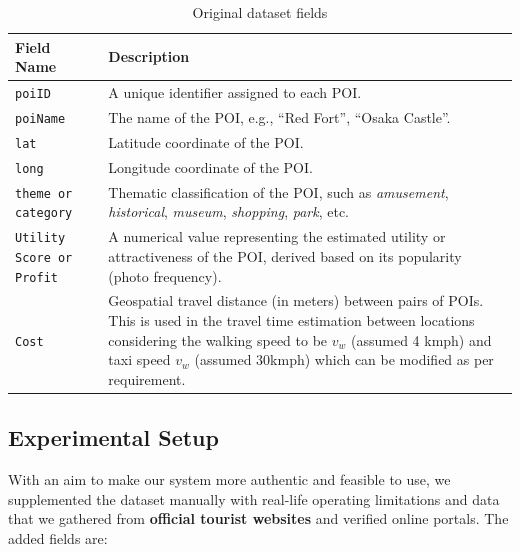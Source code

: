 \begin{table}[H]
\begin{tabularx}{0.5\textwidth}{p{3cm} X}
\hline
\textbf{Field Name} & \textbf{Description} \\
\hline
\texttt{poiID} & A unique identifier assigned to each POI. \\
\hline
\texttt{poiName} & The name of the POI, e.g., ``Red Fort'', ``Osaka Castle''. \\
\hline
\texttt{lat} & Latitude coordinate of the POI. \\
\hline
\texttt{long} & Longitude coordinate of the POI. \\
\hline
\texttt{theme or category} & Thematic classification of the POI, such as \textit{amusement}, \textit{historical}, \textit{museum}, \textit{shopping}, \textit{park}, etc. \\
\hline
\texttt{Utility Score or Profit} & A numerical value representing the estimated utility or attractiveness of the POI, derived based on its popularity (photo frequency). \\
\hline
\texttt{Cost} & Geospatial travel distance (in meters) between pairs of POIs. This is used in the travel time estimation between locations considering the walking speed to be $v_w$ (assumed 4 kmph) and taxi speed $v_w$ (assumed 30kmph) which can be modified as per requirement. \\
\hline
\end{tabularx}
\caption{Original dataset fields}
\end{table}

\subsection{Experimental Setup}

With an aim to make our system more authentic and feasible to use, we supplemented the dataset manually with real-life operating limitations and data that we gathered from \textbf{official tourist websites} and verified online portals. The added fields are:


